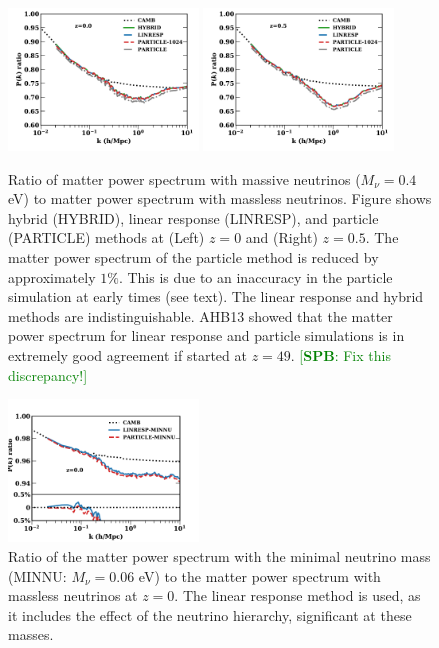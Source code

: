 \documentclass[useAMS, usenatbib]{mnras}
\newcommand{\spb}[1]{{\textcolor{green}{[{\bf SPB}: #1]}}}
\begin{document}
\begin{figure}
\includegraphics[width=0.45\textwidth]{nuplots/pks_rel-10.pdf}
\includegraphics[width=0.45\textwidth]{nuplots/pks_rel-0_66670.pdf}
  \caption{Ratio of matter power spectrum with massive neutrinos ($M_\nu = 0.4$ eV) to matter power spectrum with massless neutrinos. Figure shows hybrid (HYBRID), linear response (LINRESP), and particle (PARTICLE) methods at (Left) $z=0$ and (Right) $z=0.5$. The matter power spectrum of the particle method is reduced by approximately $1\%$. This is due to an inaccuracy in the particle simulation at early times (see text). The linear response and hybrid methods are indistinguishable. AHB13 showed that the matter power spectrum for linear response and particle simulations is in extremely good agreement if started at $z=49$. \spb{Fix this discrepancy!}
  }
  \label{fig:matter_power}
\end{figure}

\begin{figure}
\includegraphics[width=0.45\textwidth]{nuplots/pks_lowmass-10.pdf}
\caption{Ratio of the matter power spectrum with the minimal neutrino mass (MINNU: $M_\nu = 0.06$ eV) to the matter power spectrum with massless neutrinos at $z=0$. The linear response method is used, as it includes the effect of the neutrino hierarchy, significant at these masses.
}
\label{fig:minimal_mass}
\end{figure}
\end{document}
